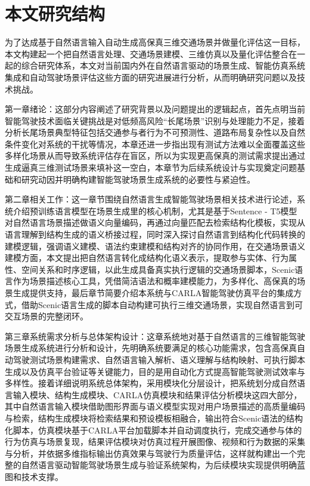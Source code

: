 \section{本文研究结构}

为了达成基于自然语言输入自动生成高保真三维交通场景并做量化评估这一目标，本文构建起一个把自然语言处理、交通场景建模\cite{du2025scene}、三维仿真以及量化评估整合在一起的综合研究体系，本文对当前国内外在自然语言驱动的场景生成、智能仿真系统集成和自动驾驶场景评估这些方面的研究进展进行分析，从而明确研究问题以及技术挑战。

第一章绪论：这部分内容阐述了研究背景以及问题提出的逻辑起点，首先点明当前智能驾驶技术面临关键挑战是对低频高风险“长尾场景”识别与处理能力不足，接着分析长尾场景典型特征包括交通参与者行为不可预测性、道路布局复杂性以及自然条件变化对系统的干扰等情况，本章还进一步指出现有测试方法难以全面覆盖这些多样化场景从而导致系统评估存在盲区，所以为实现更高保真的测试需求提出通过生成逼真三维测试场景来填补这一空白，本章节为后续系统设计与实现奠定问题基础和研究动因并明确构建智能驾驶场景生成系统的必要性与紧迫性。

第二章相关工作：这一章节围绕自然语言生成智能驾驶场景相关技术进行论述，系统介绍预训练语言模型在场景生成里的核心机制，尤其是基于Sentence - T5模型对自然语言场景描述做语义向量编码，再通过向量匹配去检索结构化模板，实现从语言理解到结构生成的语义桥接过程，同时深入探讨自然语言到结构化代码转换的建模逻辑，强调语义建模、语法约束建模和结构对齐的协同作用，在交通场景语义建模方面，本文提出把自然语言转化成结构化语义表示，提取参与实体、行为属性、空间关系和时序逻辑，以此生成具备真实执行逻辑的交通场景脚本，Scenic语言作为场景描述核心工具，凭借简洁语法和概率建模能力，为多样化、高保真的场景生成提供支持，最后章节简要介绍本系统与CARLA智能驾驶仿真平台的集成方式，借助Scenic语言生成的脚本自动构建可执行三维交通场景，实现自然语言到可交互场景的完整闭环。

第三章系统需求分析与总体架构设计：这章系统地对基于自然语言的三维智能驾驶场景生成系统进行分析和设计，先明确系统要满足的核心功能需求，包含高保真自动驾驶测试场景构建需求、自然语言输入解析、语义理解与结构映射、可执行脚本生成以及仿真平台验证等关键能力，目的是用自动化方式提高智能驾驶测试效率与多样性。接着详细说明系统总体架构，采用模块化分层设计，把系统划分成自然语言输入模块、结构生成模块、CARLA仿真模块和结果评估分析模块这四大部分，其中自然语言输入模块借助图形界面与语义模型实现对用户场景描述的高质量编码与检索，结构生成模块将检索结果和预设模板相融合，输出符合Scenic语法的结构化脚本，仿真模块基于CARLA平台加载脚本并自动调度执行，完成交通参与体的行为仿真与场景复现，结果评估模块对仿真过程开展图像、视频和行为数据的采集与分析，并依据多维指标输出仿真效果与驾驶行为质量评估，这样就构建出一个完整的自然语言驱动智能驾驶场景生成与验证系统架构，为后续模块实现提供明确蓝图和技术支撑。

